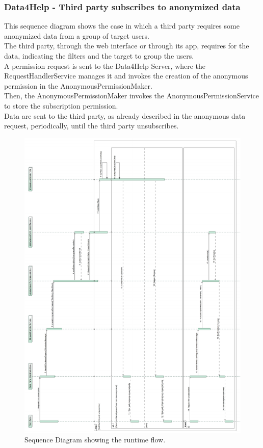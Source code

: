 \documentclass[a4paper]{article}
\begin{document}
\subsubsection{Data4Help - Third party subscribes to anonymized data}
This sequence diagram shows the case in which a third party requires some anonymized data from a group of target users. \\
The third party, through the web interface or through its app, requires for the data, indicating the filters and the target to group the users. \\
A permission request is sent to the Data4Help Server, where the RequestHandlerService manages it and invokes the creation of the anonymous permission in the AnonymousPermissionMaker. \\
Then, the AnonymousPermissionMaker invokes the AnonymousPermissionService to store the subscription permission.\\
Data are sent to the third party, as already described in the anonymous data request, periodically, until the third party unsubscribes. 

\begin{figure}[H]
    \centering
    \includegraphics[width=\linewidth]{SequenceDiagram-RequestForSubscription}
    \caption{Sequence Diagram showing the runtime flow.}
    \label{fig:my_label}
\end{figure}
\clearpage
\end{document}
